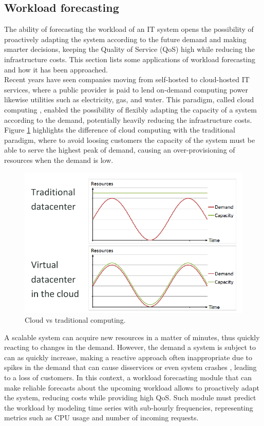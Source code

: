 \documentclass[a4paper, 12pt]{article} %
\begin{document}
	\subsection{Workload forecasting } \label{ssec:workload_forecasting}
	The ability of forecasting the workload of an IT system opens the possibility of proactively adapting the system according to the future demand and making smarter decisions, keeping the Quality of Service (QoS) high while reducing the infrastructure costs. This section lists some applications of workload forecasting and how it has been approached.\\
	Recent years have seen companies moving from self-hosted to cloud-hosted  IT services, where a public provider is paid to lend on-demand computing power likewise utilities such as electricity, gas, and water. This paradigm, called cloud computing \cite{CloudComputing}, enabled the possibility of flexibly adapting the capacity of a system according to the demand, potentially heavily reducing the infrastructure costs.  Figure \ref{fig:cloud_vs_traditional_computing} highlights the difference of cloud computing with the traditional paradigm, where to avoid loosing customers the capacity of the system must be able to serve the highest peak of demand, causing an over-provisioning of resources when the demand is low.\\
	\begin{figure}
		\includegraphics[width=\linewidth]{img/cloud_vs_traditional_computing.png}
		\caption{Cloud vs traditional computing.}
		\label{fig:cloud_vs_traditional_computing}
	\end{figure}
	A scalable system can acquire new resources in a matter of minutes, thus quickly reacting to changes in the demand. However, the demand a system is subject to can as quickly increase, making a reactive approach often inappropriate due to spikes in the demand that can cause disservices or even system crashes \cite{ArimaWorkloadPrediction}, leading to a loss of customers. In this context, a workload forecasting module that can make reliable forecasts about the upcoming workload allows to proactively adapt the system, reducing costs while providing high QoS. Such module must predict the workload by modeling time series with sub-hourly frequencies, representing metrics such as CPU usage and number of incoming requests.\\
\end{document}
